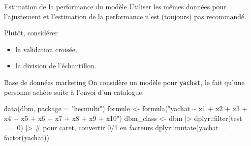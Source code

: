 \documentclass[
  ignorenonframetext,
]{beamer}
\newenvironment{Shaded}{\begin{snugshade}}{\end{snugshade}}
\newcommand{\AttributeTok}[1]{\textcolor[rgb]{0.40,0.45,0.13}{#1}}
\newcommand{\CommentTok}[1]{\textcolor[rgb]{0.37,0.37,0.37}{#1}}
\newcommand{\DecValTok}[1]{\textcolor[rgb]{0.68,0.00,0.00}{#1}}
\newcommand{\FunctionTok}[1]{\textcolor[rgb]{0.28,0.35,0.67}{#1}}
\newcommand{\NormalTok}[1]{\textcolor[rgb]{0.00,0.23,0.31}{#1}}
\newcommand{\OtherTok}[1]{\textcolor[rgb]{0.00,0.23,0.31}{#1}}
\newcommand{\SpecialCharTok}[1]{\textcolor[rgb]{0.37,0.37,0.37}{#1}}
\newcommand{\StringTok}[1]{\textcolor[rgb]{0.13,0.47,0.30}{#1}}
\providecommand{\tightlist}{%
  \setlength{\itemsep}{0pt}\setlength{\parskip}{0pt}}\usepackage{longtable,booktabs,array}
\begin{document}
\begin{frame}{Estimation de la performance du modèle}
\protect\hypertarget{estimation-de-la-performance-du-moduxe8le}{}
Utiliser les mêmes données pour l'ajustement et l'estimation de la
performance n'est (toujours) pas recommandé.

Plutôt, considérer

\begin{itemize}
\tightlist
\item
  la validation croisée,
\item
  la division de l'échantillon.
\end{itemize}
\end{frame}

\begin{frame}[fragile]{Base de données marketing}
\protect\hypertarget{base-de-donnuxe9es-marketing}{}
On considère un modèle pour \texttt{yachat}, le fait qu'une personne
achète suite à l'envoi d'un catalogue.

\begin{Shaded}
\begin{Highlighting}[numbers=left,,]
\FunctionTok{data}\NormalTok{(dbm, }\AttributeTok{package =} \StringTok{"hecmulti"}\NormalTok{)}
\NormalTok{formule }\OtherTok{\textless{}{-}} \FunctionTok{formula}\NormalTok{(}\StringTok{"yachat \textasciitilde{} x1 + x2 + x3 +}
\StringTok{                x4 + x5 + x6 + x7 + x8 + x9 + x10"}\NormalTok{)}
\NormalTok{dbm\_class }\OtherTok{\textless{}{-}}\NormalTok{ dbm }\SpecialCharTok{|\textgreater{}}
\NormalTok{  dplyr}\SpecialCharTok{::}\FunctionTok{filter}\NormalTok{(test }\SpecialCharTok{==} \DecValTok{0}\NormalTok{) }\SpecialCharTok{|\textgreater{}}
  \CommentTok{\# pour caret, convertir 0/1 en facteurs}
\NormalTok{  dplyr}\SpecialCharTok{::}\FunctionTok{mutate}\NormalTok{(}\AttributeTok{yachat =} \FunctionTok{factor}\NormalTok{(yachat))}
\end{Highlighting}
\end{Shaded}
\end{frame}
\end{document}
